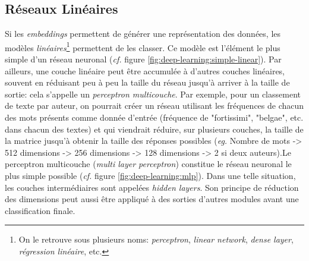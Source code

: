 \subsection{Réseaux Linéaires}
\label{deep-learning:linear}

Si les \textit{embeddings} permettent de générer une représentation des données, les modèles \textit{linéaires}\footnote{On le retrouve sous plusieurs noms: \textit{perceptron}, \textit{linear network}, \textit{dense layer}, \textit{régression linéaire}, etc.} permettent de les classer. Ce modèle est l'élément le plus simple d'un réseau neuronal (\textit{cf.} figure \ref{fig:deep-learning:simple-linear}). Par ailleurs, une couche linéaire peut être accumulée à d'autres couches linéaires, souvent en réduisant peu à peu la taille du réseau jusqu'à arriver à la taille de sortie: cela s'appelle un \textit{perceptron multicouche}. Par exemple, pour un classement de texte par auteur, on pourrait créer un réseau utilisant les fréquences de chacun des mots présents comme donnée d'entrée (fréquence de "fortissimi", "belgae", etc. dans chacun des textes) et qui viendrait réduire, sur plusieurs couches, la taille de la matrice jusqu'à obtenir la taille des réponses possibles (\textit{eg.} Nombre de mots -> 512 dimensions -> 256 dimensions -> 128 dimensions -> 2 si deux auteurs).Le perceptron multicouche (\textit{multi layer perceptron}) constitue le réseau neuronal le plus simple possible (\textit{cf.} figure \ref{fig:deep-learning:mlp}). Dans une telle situation, les couches intermédiaires sont appelées \textit{hidden layers}. Son principe de réduction des dimensions peut aussi être appliqué à des sorties d'autres modules avant une classification finale.

